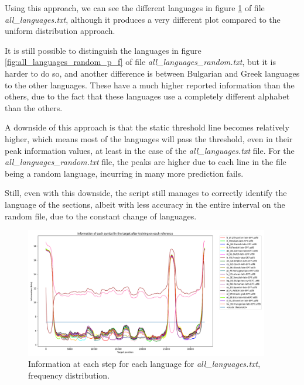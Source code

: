 \documentclass{article}
\begin{document}
Using this approach, we can see the different languages in figure \ref{fig:all_languages_p_f} of file \textit{all\_languages.txt}, although it produces a very different plot
compared to the uniform distribution approach.

It is still possible to distinguish the languages in figure \ref{fig:all_languages_random_p_f} of file \textit{all\_languages\_random.txt}, but it is harder to do so,
and another difference is between Bulgarian and Greek languages to the other languages. These have a much higher reported information than the others, due to the fact that these
languages use a completely different alphabet than the others.

A downside of this approach is that the static threshold line becomes relatively higher, which means most of the languages will pass the threshold, even in their peak information values,
at least in the case of the \textit{all\_languages.txt} file. For the \textit{all\_languages\_random.txt} file, the peaks are higher due to each line in the file being a random language, incurring in many more prediction fails.

Still, even with this downside, the script still manages to correctly identify the language of the sections, albeit with less accuracy in the entire interval on the random file,
due to the constant change of languages.

\begin{figure}
    \centering
    \includegraphics[width=0.95\textwidth]{../results/all_languages/-p_f.png}
    \caption{Information at each step for each language for \textit{all\_languages.txt}, frequency distribution.}
    \label{fig:all_languages_p_f}
\end{figure}
\end{document}
